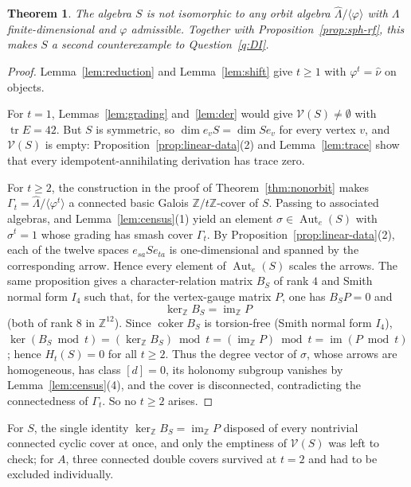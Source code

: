 \documentclass[11pt]{amsart}
\theoremstyle{plain}
\newtheorem{theorem}{Theorem}
\theoremstyle{definition}
\DeclareMathOperator{\tr}{tr}
\DeclareMathOperator{\Aut}{Aut}
\newcommand{\rep}{\widehat{\Lambda}}
\newcommand{\Nak}{\widehat{\nu}}
\newcommand{\cV}{\mathcal{V}}
\newcommand{\ZZ}{\mathbb{Z}}
\begin{document}
\begin{theorem}\label{thm:sph}
The algebra $S$ is not isomorphic to any orbit algebra $\rep/\langle\varphi\rangle$ with $\Lambda$
finite-dimensional and $\varphi$ admissible. Together with Proposition~\textup{\ref{prop:sph-rf}}, this makes
$S$ a second counterexample to Question~\textup{\ref{q:DI}}.
\end{theorem}

\begin{proof}
Lemma~\ref{lem:reduction} and Lemma~\ref{lem:shift} give $t\ge 1$ with $\varphi^t=\Nak$ on objects.

For $t=1$, Lemmas~\ref{lem:grading} and~\ref{lem:der} would give $\cV(S)\neq\emptyset$ with $\tr E=42$. But
$S$ is symmetric, so $\dim e_vS=\dim Se_v$ for every vertex $v$, and $\cV(S)$ is empty:
Proposition~\ref{prop:linear-data}(2) and Lemma~\ref{lem:trace} show that every idempotent-annihilating
derivation has trace zero.

For $t\ge 2$, the construction in the proof of Theorem~\ref{thm:nonorbit} makes
$\Gamma_t=\rep/\langle\varphi^t\rangle$ a connected basic Galois $\ZZ/t\ZZ$-cover of $S$. Passing to
associated algebras, \cite[Proposition~3.7 and Theorem~3.8]{CibilsMarcos} and Lemma~\ref{lem:census}(1) yield
an element $\sigma\in\Aut_e(S)$ with $\sigma^t=1$ whose grading has smash cover $\Gamma_t$. By
Proposition~\ref{prop:linear-data}(2), each of the twelve spaces $e_{sa}Se_{ta}$ is one-dimensional and
spanned by the corresponding arrow. Hence every element of $\Aut_e(S)$ scales the arrows. The same proposition
gives a character-relation matrix $B_S$ of rank $4$ and Smith normal form $I_4$ such that, for the
vertex-gauge matrix $P$, one has $B_SP=0$ and
\[
  \ker_{\ZZ}B_S=\operatorname{im}_{\ZZ}P
\]
(both of rank $8$ in $\ZZ^{12}$). Since $\operatorname{coker}B_S$ is torsion-free (Smith normal form $I_4$),
$\ker(B_S\bmod t)=(\ker_{\ZZ}B_S)\bmod t=(\operatorname{im}_{\ZZ}P)\bmod t=\operatorname{im}(P\bmod t)$; hence
$H_t(S)=0$ for all $t\ge 2$. Thus the degree vector of $\sigma$, whose arrows are homogeneous, has class
$[d]=0$, its holonomy subgroup vanishes by Lemma~\ref{lem:census}(4), and the cover is disconnected,
contradicting the connectedness of $\Gamma_t$. So no $t\ge 2$ arises.
\end{proof}

For $S$, the single identity $\ker_\ZZ B_S=\operatorname{im}_\ZZ P$ disposed of every nontrivial connected
cyclic cover at once, and only the emptiness of $\cV(S)$ was left to check; for $A$, three connected double
covers survived at $t=2$ and had to be excluded individually.
\end{document}
